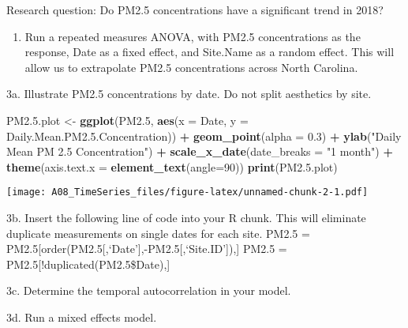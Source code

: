 \documentclass[]{article}
\newenvironment{Shaded}{\begin{snugshade}}{\end{snugshade}}
\newcommand{\KeywordTok}[1]{\textcolor[rgb]{0.13,0.29,0.53}{\textbf{#1}}}
\newcommand{\DataTypeTok}[1]{\textcolor[rgb]{0.13,0.29,0.53}{#1}}
\newcommand{\DecValTok}[1]{\textcolor[rgb]{0.00,0.00,0.81}{#1}}
\newcommand{\FloatTok}[1]{\textcolor[rgb]{0.00,0.00,0.81}{#1}}
\newcommand{\StringTok}[1]{\textcolor[rgb]{0.31,0.60,0.02}{#1}}
\newcommand{\OperatorTok}[1]{\textcolor[rgb]{0.81,0.36,0.00}{\textbf{#1}}}
\newcommand{\NormalTok}[1]{#1}
\providecommand{\tightlist}{%
  \setlength{\itemsep}{0pt}\setlength{\parskip}{0pt}}
\begin{document}
Research question: Do PM2.5 concentrations have a significant trend in
2018?

\begin{enumerate}
\def\labelenumi{\arabic{enumi}.}
\setcounter{enumi}{2}
\tightlist
\item
  Run a repeated measures ANOVA, with PM2.5 concentrations as the
  response, Date as a fixed effect, and Site.Name as a random effect.
  This will allow us to extrapolate PM2.5 concentrations across North
  Carolina.
\end{enumerate}

3a. Illustrate PM2.5 concentrations by date. Do not split aesthetics by
site.

\begin{Shaded}
\begin{Highlighting}[]
\NormalTok{PM2.}\FloatTok{5.}\NormalTok{plot <-}\StringTok{ }\KeywordTok{ggplot}\NormalTok{(PM2.}\DecValTok{5}\NormalTok{, }\KeywordTok{aes}\NormalTok{(}\DataTypeTok{x =}\NormalTok{ Date, }\DataTypeTok{y =}\NormalTok{ Daily.Mean.PM2.}\FloatTok{5.}\NormalTok{Concentration)) }\OperatorTok{+}
\StringTok{  }\KeywordTok{geom_point}\NormalTok{(}\DataTypeTok{alpha =} \FloatTok{0.3}\NormalTok{) }\OperatorTok{+}
\StringTok{  }\KeywordTok{ylab}\NormalTok{(}\StringTok{"Daily Mean PM 2.5 Concentration"}\NormalTok{) }\OperatorTok{+}
\StringTok{  }\KeywordTok{scale_x_date}\NormalTok{(}\DataTypeTok{date_breaks =} \StringTok{"1 month"}\NormalTok{) }\OperatorTok{+}
\StringTok{  }\KeywordTok{theme}\NormalTok{(}\DataTypeTok{axis.text.x =} \KeywordTok{element_text}\NormalTok{(}\DataTypeTok{angle=}\DecValTok{90}\NormalTok{))}
\KeywordTok{print}\NormalTok{(PM2.}\FloatTok{5.}\NormalTok{plot)}
\end{Highlighting}
\end{Shaded}

\texttt{[image: A08\_TimeSeries\_files/figure-latex/unnamed-chunk-2-1.pdf]}

3b. Insert the following line of code into your R chunk. This will
eliminate duplicate measurements on single dates for each site. PM2.5 =
PM2.5{[}order(PM2.5{[},`Date'{]},-PM2.5{[},`Site.ID'{]}),{]} PM2.5 =
PM2.5{[}!duplicated(PM2.5\$Date),{]}

3c. Determine the temporal autocorrelation in your model.

3d. Run a mixed effects model.
\end{document}
